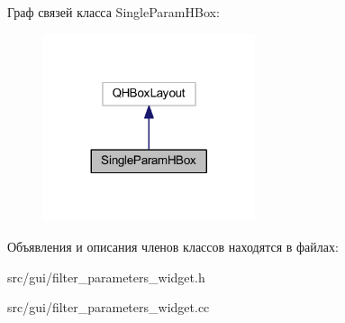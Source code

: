 Граф связей класса Single\+Param\+H\+Box\+:
\nopagebreak
\begin{figure}[H]
\begin{center}
\leavevmode
\includegraphics[width=176pt]{class_single_param_h_box__coll__graph}
\end{center}
\end{figure}


Объявления и описания членов классов находятся в файлах\+:\begin{DoxyCompactItemize}
\item 
src/gui/filter\+\_\+parameters\+\_\+widget.\+h\item 
src/gui/filter\+\_\+parameters\+\_\+widget.\+cc\end{DoxyCompactItemize}
